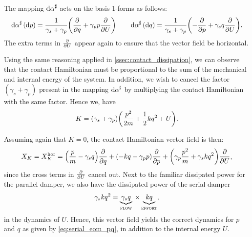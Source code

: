 The mapping $\dd{\alpha}^\sharp$ acts on the basis 1-forms as follows:
$$ 
    \dd{\alpha}^\sharp(\dd{p}) = \frac{1}{\gamma_s + \gamma_p}\qty(\pdv{}{q} + \gamma_p p\pdv{}{U}) \qquad
    \dd{\alpha}^\sharp(\dd{q}) = \frac{1}{\gamma_s + \gamma_p}\qty(-\pdv{}{p} + \gamma_s q\pdv{}{U}).
$$
The extra terms in $\pdv{}{U}$ appear again to ensure that the vector field be horizontal.

Using the same reasoning applied in \cref{ssec:contact_dissipation}, we can observe that the contact Hamiltonian must be proportional to the sum of the mechanical and internal energy of the system. In addition, we wish to cancel the factor $(\gamma_s + \gamma_p)$ present in the mapping $\dd{\alpha}^\sharp$ by multiplying the contact Hamiltonian with the same factor. Hence we, have
$$ K = (\gamma_s + \gamma_p)\qty(\frac{p^2}{2m} + \frac{1}{2}kq^2 + U). $$

Assuming again that $K = 0$, the contact Hamiltonian vector field is then:
$$ X_K = X_K^\text{hor} = \qty(\frac{p}{m} - \gamma_s q)\pdv{}{q} + \qty(-kq -\gamma_p p)\pdv{}{p} + \qty(\gamma_p\frac{p^2}{m} + \gamma_s kq^2 )\pdv{}{U}, $$
since the cross terms in $\pdv{}{U}$ cancel out. Next to the familiar dissipated power for the parallel damper, we also have the dissipated power of the serial damper
$$ \gamma_s kq^2 = \underbrace{\gamma_s q}_\text{\textsc{flow}} \: \times \underbrace{kq}_\text{\textsc{effort}}, $$ 
in the dynamics of $U$. Hence, this vector field yields the correct dynamics for $p$ and $q$ as given by \cref{eq:serial_eom_pq}, in addition to the internal energy $U$.

